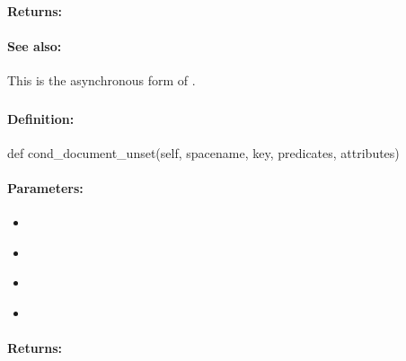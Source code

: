 \paragraph{Returns:}


\paragraph{See also:}  This is the asynchronous form of .

\pagebreak
\subsubsection{}
\label{api:python:cond_document_unset}


\paragraph{Definition:}
\begin{pythoncode}
def cond_document_unset(self, spacename, key, predicates, attributes)
\end{pythoncode}

\paragraph{Parameters:}
\begin{itemize}[noitemsep]
\item {}\\

\item {}\\

\item {}\\

\item {}\\

\end{itemize}

\paragraph{Returns:}


